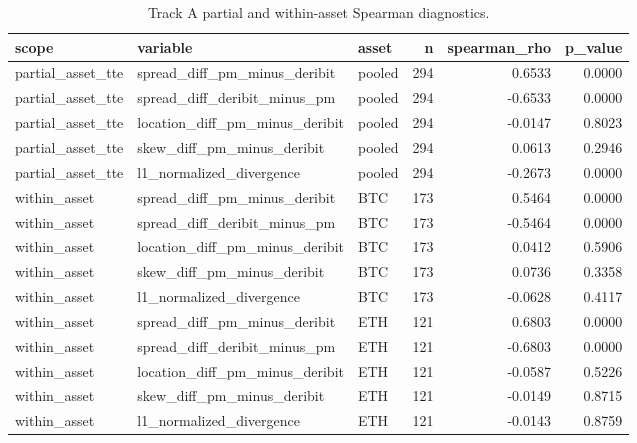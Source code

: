 \begin{table}
\caption{Track A partial and within-asset Spearman diagnostics.}
\label{tab:trackA_partial_spearman}
\begin{tabular}{lllrrr}
\toprule
scope & variable & asset & n & spearman\_rho & p\_value \\
\midrule
partial\_asset\_tte & spread\_diff\_pm\_minus\_deribit & pooled & 294 & 0.6533 & 0.0000 \\
partial\_asset\_tte & spread\_diff\_deribit\_minus\_pm & pooled & 294 & -0.6533 & 0.0000 \\
partial\_asset\_tte & location\_diff\_pm\_minus\_deribit & pooled & 294 & -0.0147 & 0.8023 \\
partial\_asset\_tte & skew\_diff\_pm\_minus\_deribit & pooled & 294 & 0.0613 & 0.2946 \\
partial\_asset\_tte & l1\_normalized\_divergence & pooled & 294 & -0.2673 & 0.0000 \\
within\_asset & spread\_diff\_pm\_minus\_deribit & BTC & 173 & 0.5464 & 0.0000 \\
within\_asset & spread\_diff\_deribit\_minus\_pm & BTC & 173 & -0.5464 & 0.0000 \\
within\_asset & location\_diff\_pm\_minus\_deribit & BTC & 173 & 0.0412 & 0.5906 \\
within\_asset & skew\_diff\_pm\_minus\_deribit & BTC & 173 & 0.0736 & 0.3358 \\
within\_asset & l1\_normalized\_divergence & BTC & 173 & -0.0628 & 0.4117 \\
within\_asset & spread\_diff\_pm\_minus\_deribit & ETH & 121 & 0.6803 & 0.0000 \\
within\_asset & spread\_diff\_deribit\_minus\_pm & ETH & 121 & -0.6803 & 0.0000 \\
within\_asset & location\_diff\_pm\_minus\_deribit & ETH & 121 & -0.0587 & 0.5226 \\
within\_asset & skew\_diff\_pm\_minus\_deribit & ETH & 121 & -0.0149 & 0.8715 \\
within\_asset & l1\_normalized\_divergence & ETH & 121 & -0.0143 & 0.8759 \\
\bottomrule
\end{tabular}
\end{table}
